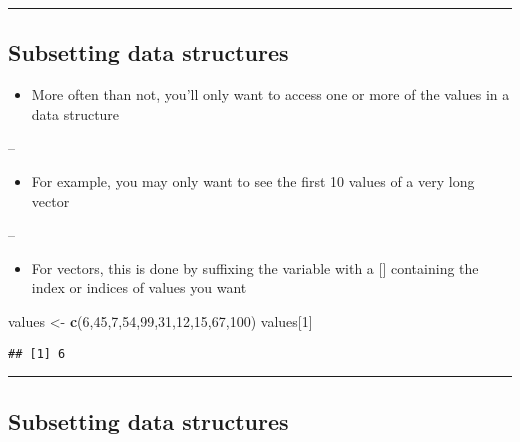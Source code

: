 \documentclass[]{article}
\newenvironment{Shaded}{\begin{snugshade}}{\end{snugshade}}
\newcommand{\DecValTok}[1]{\textcolor[rgb]{0.00,0.00,0.81}{#1}}
\newcommand{\KeywordTok}[1]{\textcolor[rgb]{0.13,0.29,0.53}{\textbf{#1}}}
\newcommand{\NormalTok}[1]{#1}
\newcommand{\StringTok}[1]{\textcolor[rgb]{0.31,0.60,0.02}{#1}}
\providecommand{\tightlist}{%
  \setlength{\itemsep}{0pt}\setlength{\parskip}{0pt}}
\begin{document}
\begin{center}\rule{0.5\linewidth}{\linethickness}\end{center}

\hypertarget{subsetting-data-structures}{%
\subsection{Subsetting data
structures}\label{subsetting-data-structures}}

\begin{itemize}
\tightlist
\item
  More often than not, you'll only want to access one or more of the
  values in a data structure
\end{itemize}

--

\begin{itemize}
\tightlist
\item
  For example, you may only want to see the first 10 values of a very
  long vector
\end{itemize}

--

\begin{itemize}
\tightlist
\item
  For vectors, this is done by suffixing the variable with a {[}{]}
  containing the index or indices of values you want
\end{itemize}

\begin{Shaded}
\begin{Highlighting}[]
\NormalTok{values <-}\StringTok{ }\KeywordTok{c}\NormalTok{(}\DecValTok{6}\NormalTok{,}\DecValTok{45}\NormalTok{,}\DecValTok{7}\NormalTok{,}\DecValTok{54}\NormalTok{,}\DecValTok{99}\NormalTok{,}\DecValTok{31}\NormalTok{,}\DecValTok{12}\NormalTok{,}\DecValTok{15}\NormalTok{,}\DecValTok{67}\NormalTok{,}\DecValTok{100}\NormalTok{)}
\NormalTok{values[}\DecValTok{1}\NormalTok{]}
\end{Highlighting}
\end{Shaded}

\begin{verbatim}
## [1] 6
\end{verbatim}

\begin{center}\rule{0.5\linewidth}{\linethickness}\end{center}

\hypertarget{subsetting-data-structures-1}{%
\subsection{Subsetting data
structures}\label{subsetting-data-structures-1}}
\end{document}
